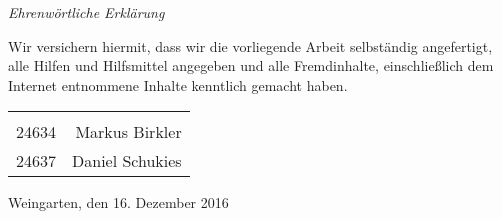 \newpage
\thispagestyle{empty}

\begin{center}

\emph{\LARGE Ehrenw\"ortliche Erkl\"arung}\\[2.5cm]
\end{center}
\normalsize Wir versichern hiermit, dass wir die vorliegende Arbeit selbst\"andig angefertigt, alle Hilfen und Hilfsmittel angegeben und alle Fremdinhalte, einschlie{\ss}lich dem Internet entnommene Inhalte kenntlich gemacht haben. \\[1.0cm]

\begin{table}[h]
\begin{tabular}{lr}
\hline
\\
24634 & Markus Birkler \\ 
24637 & Daniel Schukies \\
\end{tabular}
\end{table}

\vfill

\begin{flushleft}
Weingarten, den 16. Dezember 2016
\end{flushleft}
